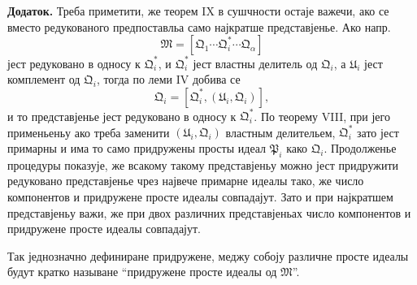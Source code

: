 ﻿\documentclass[11pt]{article}
\newcommand{\ideal}[1]{\mathfrak{#1}}
\begin{document}
\textbf{Додаток.} Треба приметити, же теорем IX в сушчности остаје важечи, ако се вместо редукованого предпоставльа само најкратше представјенье. Ако напр.
\[
 \ideal M=[\ideal Q_1\cdots\ideal Q_i^*\cdots\ideal Q_\alpha]
\]
јест редуковано в односу к \(\ideal Q_i^*\), и \(\ideal Q_i^*\) јест властны делитель од \(\ideal Q_i\), а \(\ideal U_i\) јест комплемент од \(\ideal Q_i\), тогда по леми IV добива се
\[
 \ideal Q_i=[\ideal Q_i^*,(\ideal U_i,\ideal Q_i)],
\]
и то представјенье јест редуковано в односу к \(\ideal Q_i^*\). По теорему VIII, при јего применьеньу ако треба заменити \((\ideal U_i,\ideal Q_i)\) властным делительем, \(\ideal Q_i^*\) зато јест примарны и има то само придружены просты идеал \(\ideal P_i\) како \(\ideal Q_i\). Продолженье процедуры показује, же всакому такому представјеньу можно јест придружити редуковано представјенье чрез највече примарне идеалы тако, же число компонентов и придружене просте идеалы совпадајут. Зато и при најкратшем представјеньу важи, же при двох различних представјеньах число компонентов и придружене просте идеалы совпадајут.

Так једнозначно дефиниране придружене, меджу собоју различне просте идеалы будут кратко называне ``придружене просте идеалы од \(\ideal M\)''.
\end{document}

